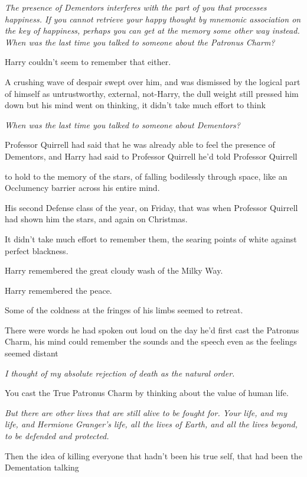 \emph{The presence of Dementors interferes with the part of you that processes
happiness. If you cannot retrieve your happy thought by mnemonic association on
the key of happiness, perhaps you can get at the memory some other way instead.
When was the last time you talked to someone about the Patronus Charm?}

Harry couldn't seem to remember that either.

A crushing wave of despair swept over him, and was dismissed by the logical
part of himself as untrustworthy, external, not-Harry, the dull weight still
pressed him down but his mind went on thinking, it didn't take much effort to
think{\el}

\emph{When was the last time you talked to someone about Dementors?}

Professor Quirrell had said that he was already able to feel the presence of
Dementors, and Harry had said to Professor Quirrell{\el} he'd told Professor
Quirrell{\el}

{\el} to hold to the memory of the stars, of falling bodilessly through
space, like an Occlumency barrier across his entire mind.

His second Defense class of the year, on Friday, that was when Professor
Quirrell had shown him the stars, and again on Christmas.

It didn't take much effort to remember them, the searing points of white
against perfect blackness.

Harry remembered the great cloudy wash of the Milky Way.

Harry remembered the peace.

Some of the coldness at the fringes of his limbs seemed to retreat.

There were words he had spoken out loud on the day he'd first cast the Patronus
Charm, his mind could remember the sounds and the speech even as the feelings
seemed distant{\el}

{\el} \emph{I thought of my absolute rejection of death as the natural order.}

You cast the True Patronus Charm by thinking about the value of human life.

\emph{{\el}But there are other lives that are still alive to be fought for.
Your life, and my life, and Hermione Granger's life, all the lives of Earth,
and all the lives beyond, to be defended and protected.}

Then the idea of killing everyone{\el} that hadn't been his true self, that
had been the Dementation talking{\el}

